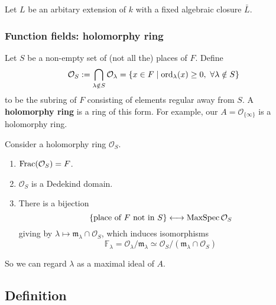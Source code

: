 \documentclass{article}
\newcommand{\F}{\mathbb{F}}
\renewcommand{\O}{\mathcal{O}}
\newcommand{\m}{\mathfrak{m}}
\begin{document}
Let $L$ be an arbitary extension of $k$ with a fixed algebraic closure $\bar{L}$.


\subsubsection*{Function fields: holomorphy ring}
Let $S$ be a non-empty set of (not all the) places of $F$.
Define \[\O_S := \bigcap_{\lambda\notin S} \O_\lambda = \{x\in F\mid \ord_\lambda(x)\ge 0,\ \forall\lambda\notin S\}\]
to be the subring of $F$ consisting of elements regular away from $S$.
A \textbf{holomorphy ring} is a ring of this form.
For example, our $A = \O_{\{\infty\}}$ is a holomorphy ring.

\begin{proposition}
Consider a holomorphy ring $\O_S$.
\begin{enumerate}[(1)]
    \item $\Frac(\O_S) = F$.
    \item $\O_S$ is a Dedekind domain.
    \item There is a bijection \[\{\text{place of }F\text{ not in }S\}\longleftrightarrow \spm \O_S\] giving by $\lambda\mapsto \m_\lambda\cap\O_S$, which induces isomorphisms \[\F_\lambda = \O_\lambda/\m_\lambda\simeq \O_S/(\m_\lambda\cap\O_S)\]
\end{enumerate}
\end{proposition}
So we can regard $\lambda$ as a maximal ideal of $A$.

\subsection{Definition}
\end{document}
